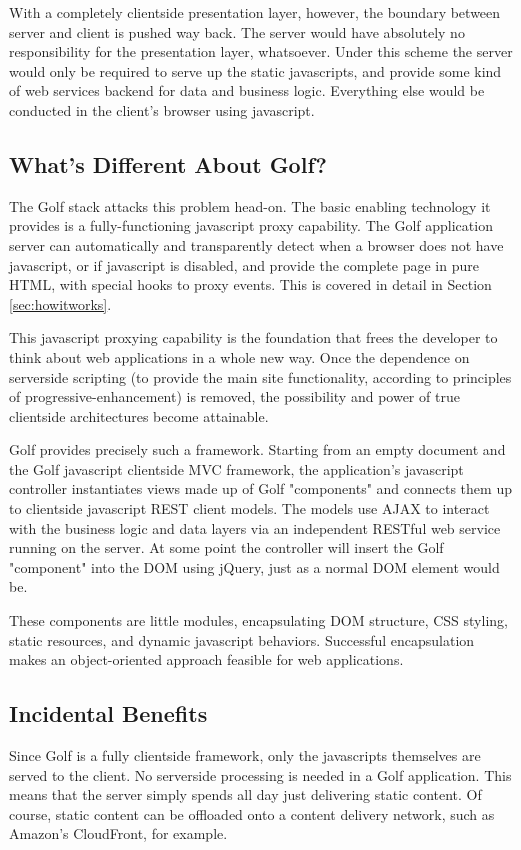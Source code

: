 With a completely clientside presentation layer, however, the boundary
between server and client is pushed way back. The server would have
absolutely no responsibility for the presentation layer, whatsoever.
Under this scheme the server would only be required to serve up the
static javascripts, and provide some kind of web services backend for
data and business logic. Everything else would be conducted in the
client's browser using javascript.

\subsection{What's Different About Golf?}

The Golf stack attacks this problem head-on. The basic enabling
technology it provides is a fully-functioning javascript proxy
capability. The Golf application server can automatically and
transparently detect when a browser does not have javascript, or if
javascript is disabled, and provide the complete page in pure HTML,
with special hooks to proxy events. This is covered in detail in
Section \ref{sec:howitworks}.

This javascript proxying capability is the foundation that frees the
developer to think about web applications in a whole new way.  Once
the dependence on serverside scripting (to provide the main site
functionality, according to principles of progressive-enhancement) is
removed, the possibility and power of true clientside architectures
become attainable.

Golf provides precisely such a framework. Starting from an empty
document and the Golf javascript clientside MVC framework, the
application's javascript controller instantiates views made up of Golf
"components" and connects them up to clientside javascript REST client
models. The models use AJAX to interact with the business logic and
data layers via an independent RESTful web service running on the
server. At some point the controller will insert the Golf "component"
into the DOM using jQuery, just as a normal DOM element would be.

These components are little modules, encapsulating DOM structure, CSS
styling, static resources, and dynamic javascript behaviors.
Successful encapsulation makes an object-oriented approach feasible
for web applications.

\subsection{Incidental Benefits}

Since Golf is a fully clientside framework, only the javascripts
themselves are served to the client. No serverside processing is
needed in a Golf application. This means that the server simply
spends all day just delivering static content. Of course, static
content can be offloaded onto a content delivery network, such as
Amazon's CloudFront, for example.

